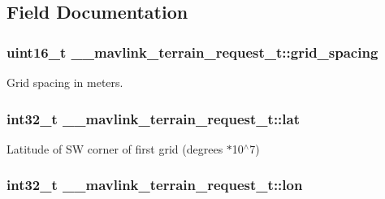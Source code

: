 \subsection{Field Documentation}
\hypertarget{struct____mavlink__terrain__request__t_ab6740d52e135fe0c33d3ed2f0556a039}{
\subsubsection[{grid\+\_\+spacing}]{\setlength{\rightskip}{0pt plus 5cm}uint16\+\_\+t \+\_\+\+\_\+mavlink\+\_\+terrain\+\_\+request\+\_\+t\+::grid\+\_\+spacing}}\label{struct____mavlink__terrain__request__t_ab6740d52e135fe0c33d3ed2f0556a039}


Grid spacing in meters. 

\hypertarget{struct____mavlink__terrain__request__t_ad380952916838f9fca5b0c55516bf965}{
\subsubsection[{lat}]{\setlength{\rightskip}{0pt plus 5cm}int32\+\_\+t \+\_\+\+\_\+mavlink\+\_\+terrain\+\_\+request\+\_\+t\+::lat}}\label{struct____mavlink__terrain__request__t_ad380952916838f9fca5b0c55516bf965}


Latitude of S\+W corner of first grid (degrees $\ast$10$^\wedge$7) 

\hypertarget{struct____mavlink__terrain__request__t_a5fb5ef1cc52e2243db460cb653369b68}{
\subsubsection[{lon}]{\setlength{\rightskip}{0pt plus 5cm}int32\+\_\+t \+\_\+\+\_\+mavlink\+\_\+terrain\+\_\+request\+\_\+t\+::lon}}\label{struct____mavlink__terrain__request__t_a5fb5ef1cc52e2243db460cb653369b68}


